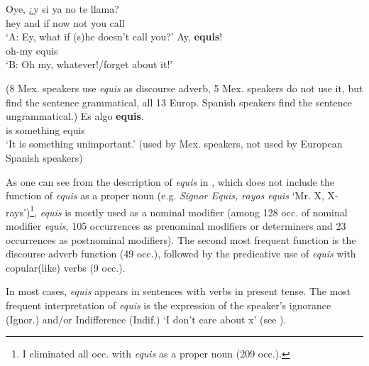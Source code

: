 \documentclass[output=paper]{langsci/langscibook}
\begin{document}
\ea\label{ex:kellert:7}
\begin{xlist}
\gll Oye, {¿}y si ya no te llama?\\
hey and if now not you call\\
\glt ‘A: Ey, what if (s)he doesn’t call you?'
Ay, \textbf{equis}!\\
oh-my equis\\
\glt ‘B: Oh my, whatever!\slash forget about it!’\\
\end{xlist}
(8 Mex. speakers use \textit{equis} as discourse adverb, 5 Mex. speakers do not use it, but find the sentence grammatical, all 13 Europ. Spanish speakers find the sentence ungrammatical.)
\ex \label{ex:kellert:8}
\gll Es algo \textbf{equis}.\\
is something equis\\
\glt ‘It is something unimportant.’
(used by Mex. speakers, not used by European Spanish speakers)
\z

As one can see from the description of \textit{equis} in , which does not include the function of \textit{equis} as a proper noun (e.g. \textit{Signor Equis, rayos equis} ‘Mr. X, X-rays’)\footnote{I eliminated all occ. with \textit{equis} as a proper noun (209 occ.).}, \textit{equis} is mostly used as a nominal modifier (among 128 occ. of nominal modifier \textit{equis}, 105 occurrences as prenominal modifiers or determiners and 23 occurrences as postnominal modifiers). The second most frequent function is the discourse adverb function (49 occ.), followed by the predicative use of \textit{equis} with copular(like) verbs (9 occ.).

In most cases, \textit{equis} appears in sentences with verbs in present tense. The most frequent interpretation of \textit{equis} is the expression of the speaker’s ignorance (Ignor.) and/or Indifference (Indif.) ‘I don’t care about x’ (see ).
\end{document}
